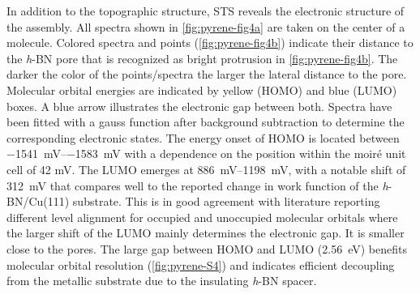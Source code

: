 In addition to the topographic structure, STS reveals the electronic structure of the assembly. All spectra shown in \autoref{fig:pyrene-fig4a} are taken on the center of a molecule. Colored spectra and points (\autoref{fig:pyrene-fig4b}) indicate their distance to the \textit{h}-BN pore that is recognized as bright protrusion in \autoref{fig:pyrene-fig4b}. The darker the color of the points/spectra the larger the lateral distance to the pore. Molecular orbital energies are indicated by yellow (HOMO) and blue (LUMO) boxes. A blue arrow illustrates the electronic gap between both. Spectra have been fitted with a gauss function after background subtraction to determine the corresponding electronic states. The energy onset of HOMO is located between \SIrange{-1541}{-1583}{\milli \volt} with a dependence on the position within the moir\'e unit cell of 42 mV. The LUMO emerges at \SIrange{886}{1198}{\milli \volt}, with a notable shift of \SI{312}{\milli \volt} that compares well to the reported change in work function of the \textit{h}-BN/Cu(111) substrate.\cite{Sushobhan_Control_2014,Liu_Interplay_2015,Schulz_Templated_2013,urgel_controlling_2015} This is in good agreement with literature reporting different level alignment for occupied and unoccupied molecular orbitals where the larger shift of the LUMO mainly determines the electronic gap. It is smaller close to the pores.\cite{Kumar_Molecular_2017} The large gap between HOMO and LUMO (\SI{2.56}{\eV}) benefits molecular orbital resolution (\autoref{fig:pyrene-S4}) and indicates efficient decoupling from the metallic substrate due to the insulating \textit{h}-BN spacer. 


